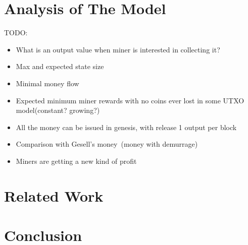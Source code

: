 \documentclass[]{article}   %
\begin{document}


\section{Analysis of The Model}

TODO:

\begin{itemize}

\item{What is an output value when miner is interested in collecting it?}

\item{Max and expected state size}

\item{Minimal money flow}

\item{Expected minimum miner rewards with no coins ever lost in some UTXO model(constant? growing?)}

\item{All the money can be issued in genesis, with release 1 output per block}

\item{Comparison with Gesell's money~(money with demurrage)}

\item{Miners are getting a new kind of profit}

\end{itemize}


\section{Related Work}

\section{Conclusion}



\end{document}
